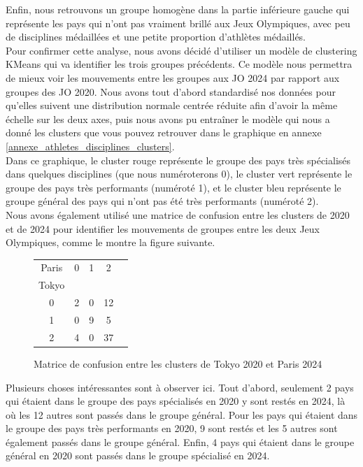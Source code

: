 \documentclass{article}
\begin{document}
Enfin, nous retrouvons un groupe homogène dans la partie inférieure gauche qui représente les pays qui n'ont pas vraiment brillé aux Jeux Olympiques, avec peu de disciplines médaillées et une petite proportion d'athlètes médaillés.
\\

Pour confirmer cette analyse, nous avons décidé d'utiliser un modèle de clustering KMeans qui va identifier les trois groupes précédents. Ce modèle nous permettra de mieux voir les mouvements entre les groupes aux JO 2024 par rapport aux groupes des JO 2020. Nous avons tout d'abord standardisé nos données pour qu'elles suivent une distribution normale centrée réduite afin d'avoir la même échelle sur les deux axes, puis nous avons pu entraîner le modèle qui nous a donné les clusters que vous pouvez retrouver dans le graphique en annexe \ref{annexe_athletes_disciplines_clusters}.
\\

Dans ce graphique, le cluster rouge représente le groupe des pays très spécialisés dans quelques disciplines (que nous numéroterons 0), le cluster vert représente le groupe des pays très performants (numéroté 1), et le cluster bleu représente le groupe général des pays qui n'ont pas été très performants (numéroté 2).
\\

Nous avons également utilisé une matrice de confusion entre les clusters de 2020 et de 2024 pour identifier les mouvements de groupes entre les deux Jeux Olympiques, comme le montre la figure suivante.

\begin{figure}[H]
\begin{center}
    \begin{tabular}{|c|c|c|c|c}
    \hline
        Paris & 0 & 1 & 2  \\
        Tokyo &   &   &    \\
        \hline
        0     & 2 & 0 & 12 \\
        \hline
        1     & 0 & 9 & 5  \\
        \hline
        2     & 4 & 0 & 37 \\
        \hline
    \end{tabular}
\end{center}
\caption{Matrice de confusion entre les clusters de Tokyo 2020 et Paris 2024}
\label{fig:enter-label}
\end{figure}

Plusieurs choses intéressantes sont à observer ici. Tout d'abord, seulement 2 pays qui étaient dans le groupe des pays spécialisés en 2020 y sont restés en 2024, là où les 12 autres sont passés dans le groupe général. Pour les pays qui étaient dans le groupe des pays très performants en 2020, 9 sont restés et les 5 autres sont également passés dans le groupe général. Enfin, 4 pays qui étaient dans le groupe général en 2020 sont passés dans le groupe spécialisé en 2024.
\end{document}
